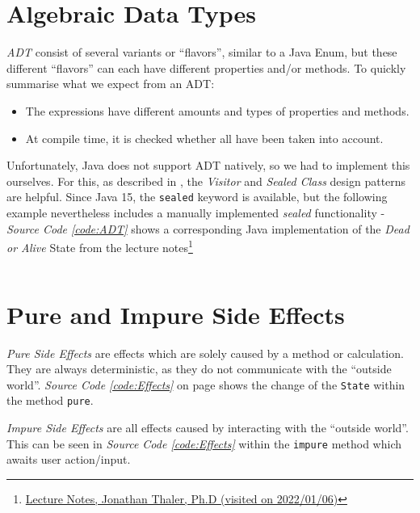 \documentclass[a4paper,12pt,twoside]{scrreprt}
\begin{document}
\clearpage

\section{Algebraic Data Types}
\textit{\ac{ADT}} consist of several variants or \enquote{flavors}, similar to a Java Enum, but these different \enquote{flavors} can each have different properties and/or methods. To quickly summarise what we expect from an \ac{ADT}:
\begin{itemize}
    \item The expressions have different amounts and types of properties and methods.
    \item At compile time, it is checked whether all have been taken into account.
\end{itemize}

Unfortunately, Java does not support \ac{ADT} natively, so we had to implement this ourselves. For this, as described in \cite{MAINIERO_algebraic_2020}, the \textit{Visitor} and \textit{Sealed Class} design patterns are helpful. Since Java 15, the \texttt{sealed} keyword is available, but the following example nevertheless includes a manually implemented \textit{sealed} functionality - \textit{Source Code \ref{code:ADT}} shows a corresponding Java implementation of the \textit{Dead or Alive} State from the lecture notes\footnote{\href{https://homepages.fhv.at/thjo/lecturenotes/concepts/declaring-types.html\#algebraic-data-types-1}{Lecture Notes, Jonathan Thaler, Ph.D (visited on 2022/01/06)}}

\inputminted[fontsize=\footnotesize,linenos,breaklines,breakanywhere]{java}{./code/AlgebraicDataTypes.java}

\begin{center}
\end{center}

\section{Pure and Impure Side Effects}
\textit{Pure Side Effects} are effects which are solely caused by a method or calculation. They are always deterministic, as they do not communicate with the \enquote{outside world}. \textit{Source Code \ref{code:Effects}} on page \pageref{code:Effects} shows the change of the \texttt{State} within the method \texttt{pure}.

\textit{Impure Side Effects} are all effects caused by interacting with the \enquote{outside world}. This can be seen in \textit{Source Code \ref{code:Effects}} within the \texttt{impure} method which awaits user action/input.
\end{document}
